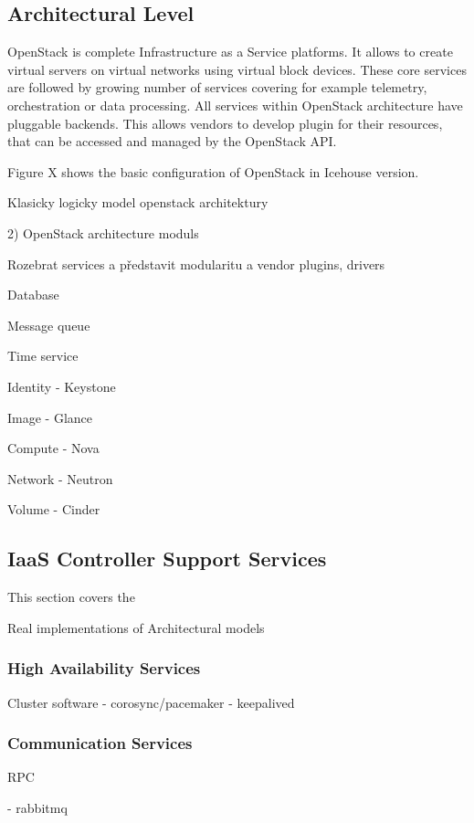 \subsection{Architectural Level}

OpenStack is complete Infrastructure as a Service platforms. It allows to create virtual servers on virtual networks using virtual block devices. These core services are followed by growing number of services covering for example telemetry, orchestration or data processing. All services within OpenStack architecture have pluggable backends. This allows vendors to develop plugin for their resources, that can be accessed and managed by the OpenStack API.

Figure X shows the basic configuration of OpenStack in Icehouse version.

Klasicky logicky model openstack architektury

2) OpenStack architecture moduls

Rozebrat services a představit modularitu a vendor plugins, drivers

Database

Message queue

Time service

Identity - Keystone

Image - Glance

Compute - Nova

Network - Neutron

Volume - Cinder

\subsection{IaaS Controller Support Services}

This section covers the 

Real implementations of Architectural models

\subsubsection{High Availability Services}

Cluster software
- corosync/pacemaker
- keepalived

\subsubsection{Communication Services}

RPC

- rabbitmq

